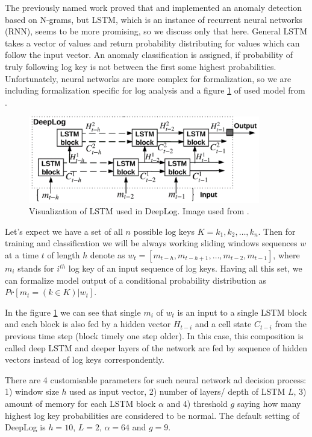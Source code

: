 The previously named work proved that and implemented an anomaly detection based on N-grams, but LSTM, which is an instance of recurrent neural networks (RNN), seems to be more promising, so we discuss only that here. General LSTM takes a vector of values and return probability distributing for values which can follow the input vector. An anomaly classification is assigned, if probability of truly following log key is not between the first some highest probabilities. Unfortunately, neural networks are more complex for formalization, so we are including formalization specific for log analysis and a figure \ref{fig:sota_lstm_deeplog} of used model from \cite{du2017deeplog}.

\begin{figure}[h]
    \centering
    \includegraphics[width=0.9\textwidth]{figures/stateOfTheArt/deepLogLSTM.png}
    \caption{Visualization of LSTM used in DeepLog. Image used from \cite{du2017deeplog}.}
    \label{fig:sota_lstm_deeplog}
\end{figure}

Let’s expect we have a set of all $n$ possible log keys $K={ k_{1}, k_{2}, … , k_{n}}$. Then for training and classification we will be always working sliding windows sequences $w$ at a time $t$ of length $h$ denote as $ w_{t} = [m_{t-h}, m_{t-h+1}, … , m_{t-2}, m_{t-1}]$, where $m_{i}$ stands for $i^{th}$ log key of an input sequence of log keys. Having all this set, we can formalize model output of a conditional probability distribution as $Pr[m_{t} = (k \in K) |w_{t} ]$. 

In the figure \ref{fig:sota_lstm_deeplog} we can see that single $m_{i}$ of $w_{t}$ is an input to a single LSTM block and each block is also fed by a hidden vector $H_{t-i}$ and a cell state $C_{t-i}$ from the previous time step (block timely one step older). In this case, this composition is called deep LSTM and deeper layers of the network are fed by sequence of hidden vectors instead of log keys correspondently. 

There are 4 customisable parameters for such neural network ad decision process: 1) window size $h$ used as input vector, 2) number of layers/ depth of LSTM $L$, 3) amount of memory for each LSTM block $\alpha$ and 4) threshold $g$ saying how many highest log key probabilities are considered to be normal. The default setting of DeepLog is $h=10$, $L=2$, $\alpha=64$ and $g=9$. 


